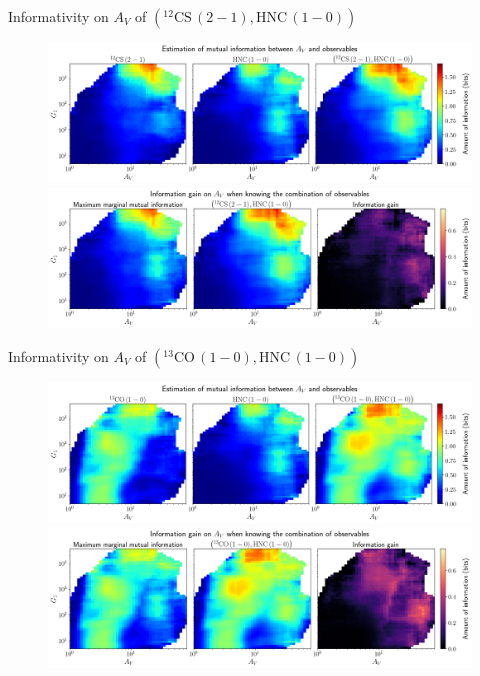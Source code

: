\documentclass{beamer}
\begin{document}
\begin{frame}{Informativity on $A_V$ of $\left(\mathrm{^{12}CS\,(2-1)},\mathrm{HNC\,(1-0)}\right)$}
    \begin{figure}
        \centering
        \includegraphics[width=0.95\linewidth]{../mi/av__12cs21_hnc10_mi.png}
        \vfill
        \includegraphics[width=0.95\linewidth]{../mi/av__12cs21_hnc10_mi_gain.png}
    \end{figure}
\end{frame}

\begin{frame}{Informativity on $A_V$ of $\left(\mathrm{^{13}CO\,(1-0)},\mathrm{HNC\,(1-0)}\right)$}
    \begin{figure}
        \centering
        \includegraphics[width=0.95\linewidth]{../mi/av__13co10_hnc10_mi.png}
        \vfill
        \includegraphics[width=0.95\linewidth]{../mi/av__13co10_hnc10_mi_gain.png}
    \end{figure}
\end{frame}
\end{document}
